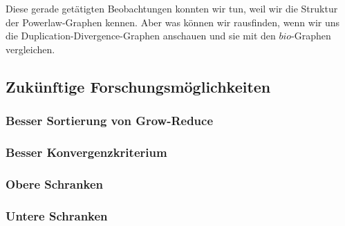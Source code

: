\documentclass[12pt,a4paper,onecolumn,oneside,titlepage]{article}
\begin{document}
Diese gerade getätigten Beobachtungen konnten wir tun, weil wir die Struktur der Powerlaw-Graphen kennen. Aber was können wir rausfinden, wenn wir uns die Duplication-Divergence-Graphen anschauen und sie mit den $bio$-Graphen vergleichen. 


\subsection{Zukünftige Forschungsmöglichkeiten}
\subsubsection{Besser Sortierung von Grow-Reduce}
\subsubsection{Besser Konvergenzkriterium}
\subsubsection{Obere Schranken}
\subsubsection{Untere Schranken}



\end{document}
